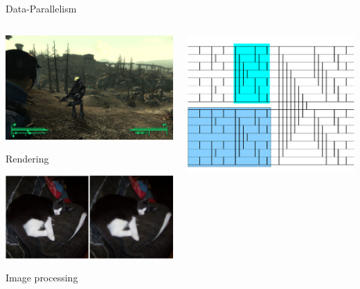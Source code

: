 \documentclass[xcolor=dvipsnames]{beamer}
\begin{document}
\begin{frame}{Data-Parallelism}

  \begin{columns} 

  \begin{column}{.48\textwidth}
  \includegraphics[width=\linewidth]{fallout.jpg}

  Rendering

  \vspace{1cm}
  \includegraphics[width=\linewidth]{kiri.jpg}

  Image processing

  \end{column} 
  
  \begin{column}{.48\textwidth} 
  \includegraphics[width=\linewidth]{mmixedsorter.pdf}


\end{column}
\end{columns}
\end{frame}
\end{document}
